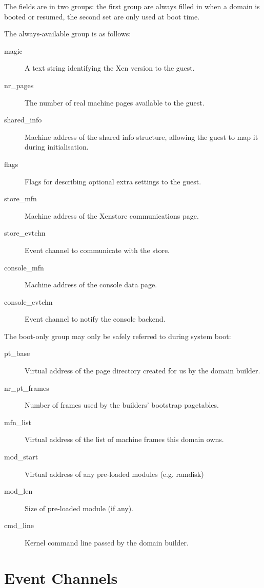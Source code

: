 \documentclass[11pt,twoside,final,openright,a4paper]{report}
\begin{document}
The fields are in two groups: the first group are always filled in
when a domain is booted or resumed, the second set are only used at
boot time.

The always-available group is as follows:

\begin{description}
\item[magic] A text string identifying the Xen version to the guest.
\item[nr\_pages] The number of real machine pages available to the
  guest.
\item[shared\_info] Machine address of the shared info structure,
  allowing the guest to map it during initialisation.
\item[flags] Flags for describing optional extra settings to the
  guest.
\item[store\_mfn] Machine address of the Xenstore communications page.
\item[store\_evtchn] Event channel to communicate with the store.
\item[console\_mfn] Machine address of the console data page.
\item[console\_evtchn] Event channel to notify the console backend.
\end{description}

The boot-only group may only be safely referred to during system boot:

\begin{description}
\item[pt\_base] Virtual address of the page directory created for us
  by the domain builder.
\item[nr\_pt\_frames] Number of frames used by the builders' bootstrap
  pagetables.
\item[mfn\_list] Virtual address of the list of machine frames this
  domain owns.
\item[mod\_start] Virtual address of any pre-loaded modules
  (e.g. ramdisk)
\item[mod\_len] Size of pre-loaded module (if any).
\item[cmd\_line] Kernel command line passed by the domain builder.
\end{description}



\chapter{Event Channels}
\label{c:eventchannels}
\end{document}
